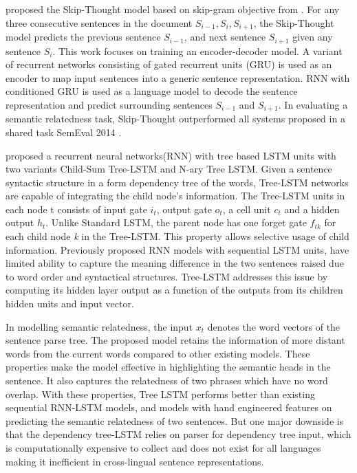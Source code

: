 \documentclass[12pt]{report} %
\begin{document}
\cite{kiros2015skip} proposed the Skip-Thought model based on skip-gram objective from \cite{mikolov2014word2vec}. For any three consecutive sentences in the document $S_{i-1}, S_{i}, S_{i+1}$, the Skip-Thought model predicts the previous sentence $S_{i-1}$, and next sentence $S_{i+1}$ given any sentence $S_{i}$.
This work focuses on training an encoder-decoder model. A variant of recurrent networks consisting of gated recurrent units (GRU) \citep{cho2014learning} is used as an encoder to map input sentences into a generic sentence representation. RNN with conditioned GRU is used as a language model to decode the sentence representation and predict surrounding sentences $S_{i-1}$ and $S_{i+1}$. In evaluating a semantic relatedness task, Skip-Thought outperformed all systems proposed in a shared task SemEval 2014 \citep{marelli2014semeval}.

\cite{tai2015improved} proposed a recurrent neural networks(RNN) with tree based LSTM units with two variants Child-Sum Tree-LSTM and N-ary Tree LSTM. Given a sentence syntactic structure in a form dependency tree of the words, Tree-LSTM networks are capable of integrating the child node's information. The Tree-LSTM units in each node t consists of input gate $i_{t}$, output gate $o_{t}$, a cell unit $c_{t}$ and a hidden output $h_{t}$. Unlike Standard LSTM, the parent node has one forget gate $f_{tk}$ for each child node \textit{k} in the Tree-LSTM. This property allows selective usage of child information. Previously proposed RNN models with sequential LSTM units, have limited ability to capture the meaning difference in the two sentences raised due to word order and syntactical structures. Tree-LSTM addresses this issue by computing its hidden layer output as a function of the outputs from its children hidden units and input vector. 

In modelling semantic relatedness, the input $x_{t}$ denotes the word vectors of the sentence parse tree. The proposed model retains the information of more distant words from the current words compared to other existing models. These properties make the model effective in highlighting the semantic heads in the sentence. It also captures the relatedness of two phrases which have no word overlap. With these properties, Tree LSTM performs better than existing sequential RNN-LSTM models, and models with hand engineered features on predicting the semantic relatedness of two sentences. But one major downside is that the dependency tree-LSTM relies on parser for dependency tree input, which is computationally expensive to collect and does not exist for all languages making it inefficient in cross-lingual sentence representations.
\end{document}
